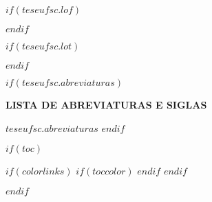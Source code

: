 $if(teseufsc.lof)$
  \clearpage
  {
    \renewcommand{\listfigurename}{LISTA DE FIGURAS}
    \listoffigures
    \thispagestyle{empty}
    \clearpage
  }
$endif$

\doublespacing
$if(teseufsc.lot)$
  \clearpage
  {
    \renewcommand{\listtablename}{LISTA DE TABELAS}
    \listoftables
    \thispagestyle{empty}
    \clearpage
  }
$endif$


$if(teseufsc.abreviaturas)$
\clearpage

\begin{center}
\textbf{LISTA DE ABREVIATURAS E SIGLAS}
\end{center}
\vspace{1.5em}
\noindent \onehalfspacing
$teseufsc.abreviaturas$
\thispagestyle{empty}
$endif$


$if(toc)$
  \clearpage
  {
    $if(colorlinks)$
      $if(toccolor)$
       \hypersetup{linkcolor=$toccolor$}
      $endif$
   $endif$
    
    \renewcommand{\contentsname}{SUMÁRIO}
    \setcounter{tocdepth}{$toc-depth$}
    \tableofcontents
    \thispagestyle{empty}
  }
$endif$
